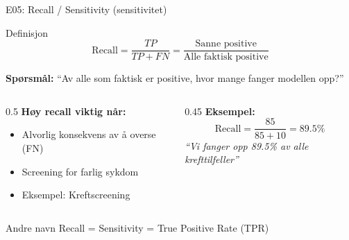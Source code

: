 \documentclass[aspectratio=169, 10pt]{beamer}
\begin{document}
\begin{frame}{E05: Recall / Sensitivity (sensitivitet)}
    
    \begin{block}{Definisjon}
        \[
        \text{Recall} = \frac{TP}{TP + FN} = \frac{\text{Sanne positive}}{\text{Alle faktisk positive}}
        \]
    \end{block}
    
    \vspace{3mm}
    
    \textbf{Spørsmål:} ``Av alle som faktisk er positive, hvor mange fanger modellen opp?''
    
    \vspace{3mm}
    
    \begin{columns}
        \begin{column}{0.5\textwidth}
            \textbf{Høy recall viktig når:}
            \begin{itemize}
                \item Alvorlig konsekvens av å overse (FN)
                \item Screening for farlig sykdom
                \item Eksempel: Kreftscreening
            \end{itemize}
        \end{column}
        
        \begin{column}{0.45\textwidth}
            \textbf{Eksempel:}
            \[
            \text{Recall} = \frac{85}{85 + 10} = 89.5\%
            \]
            \textit{``Vi fanger opp 89.5\% av alle krefttilfeller''}
        \end{column}
    \end{columns}
    
    \vspace{2mm}

    \begin{block}{\footnotesize Andre navn}
        \footnotesize Recall = Sensitivity = True Positive Rate (TPR)
    \end{block}

\end{frame}
\end{document}
